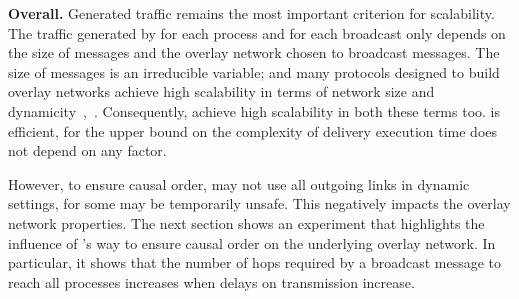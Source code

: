 \noindent \textbf{Overall.}  Generated traffic remains the most important
criterion for scalability. The traffic generated by \CBROADCAST for each process
and for each broadcast only depends on the size of messages and the overlay
network chosen to broadcast messages. The size of messages is an irreducible
variable; and many protocols designed to build overlay networks achieve high
scalability in terms of network size and
dynamicity~\cite{bertier-d2ht,jelasity2007gossip,jelasity2009tman},~\cite{nedelec2017adaptive,voulgaris2005cyclon}.
Consequently, \CBROADCAST achieve high scalability in both these terms
too. \CBROADCAST is efficient, for the upper bound on the complexity of delivery
execution time does not depend on any factor.

However, to ensure causal order, \CBROADCAST may not use all outgoing links in
dynamic settings, for some may be temporarily unsafe. This negatively impacts
the overlay network properties. The next section shows an experiment that
highlights the influence of \CBROADCAST's way to ensure causal order on the
underlying overlay network. In particular, it shows that the number of hops
required by a broadcast message to reach all processes increases when delays on
transmission increase.

